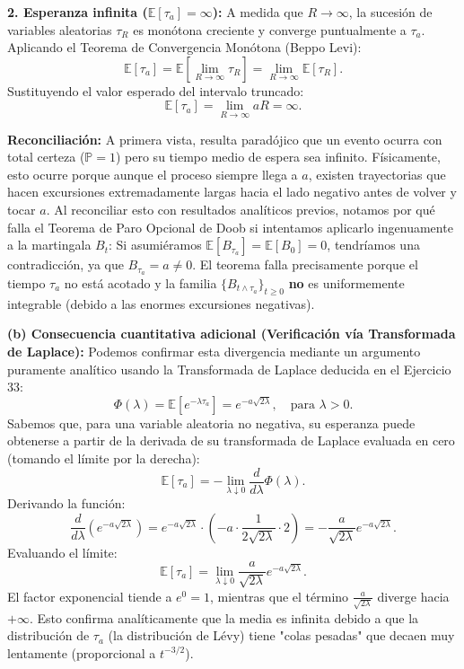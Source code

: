 \documentclass[11pt, letterpaper]{article}
\begin{document}
\begin{solucion}
    \textbf{2. Esperanza infinita ($\mathbb{E}[\tau_a] = \infty$):}
    A medida que $R \to \infty$, la sucesión de variables aleatorias $\tau_R$ es monótona creciente y converge puntualmente a $\tau_a$.
    Aplicando el Teorema de Convergencia Monótona (Beppo Levi):
    \[ \mathbb{E}[\tau_a] = \mathbb{E}\left[ \lim_{R \to \infty} \tau_R \right] = \lim_{R \to \infty} \mathbb{E}[\tau_R]. \]
    Sustituyendo el valor esperado del intervalo truncado:
    \[ \mathbb{E}[\tau_a] = \lim_{R \to \infty} aR = \infty. \]
    
    \textbf{Reconciliación:}
    A primera vista, resulta paradójico que un evento ocurra con total certeza ($\mathbb{P}=1$) pero su tiempo medio de espera sea infinito. Físicamente, esto ocurre porque aunque el proceso siempre llega a $a$, existen trayectorias que hacen excursiones extremadamente largas hacia el lado negativo antes de volver y tocar $a$.
    Al reconciliar esto con resultados analíticos previos, notamos por qué falla el Teorema de Paro Opcional de Doob si intentamos aplicarlo ingenuamente a la martingala $B_t$:
    Si asumiéramos $\mathbb{E}[B_{\tau_a}] = \mathbb{E}[B_0] = 0$, tendríamos una contradicción, ya que $B_{\tau_a} = a \neq 0$. El teorema falla precisamente porque el tiempo $\tau_a$ no está acotado y la familia $\{B_{t \wedge \tau_a}\}_{t \ge 0}$ \textbf{no} es uniformemente integrable (debido a las enormes excursiones negativas). 

    \vspace{3mm}
    \textbf{(b) Consecuencia cuantitativa adicional (Verificación vía Transformada de Laplace):}
    Podemos confirmar esta divergencia mediante un argumento puramente analítico usando la Transformada de Laplace deducida en el Ejercicio 33:
    \[ \Phi(\lambda) = \mathbb{E}[e^{-\lambda \tau_a}] = e^{-a\sqrt{2\lambda}}, \quad \text{para } \lambda > 0. \]
    Sabemos que, para una variable aleatoria no negativa, su esperanza puede obtenerse a partir de la derivada de su transformada de Laplace evaluada en cero (tomando el límite por la derecha):
    \[ \mathbb{E}[\tau_a] = -\lim_{\lambda \downarrow 0} \frac{d}{d\lambda} \Phi(\lambda). \]
    Derivando la función:
    \[ \frac{d}{d\lambda} \left( e^{-a\sqrt{2\lambda}} \right) = e^{-a\sqrt{2\lambda}} \cdot \left( -a \cdot \frac{1}{2\sqrt{2\lambda}} \cdot 2 \right) = -\frac{a}{\sqrt{2\lambda}} e^{-a\sqrt{2\lambda}}. \]
    Evaluando el límite:
    \[ \mathbb{E}[\tau_a] = \lim_{\lambda \downarrow 0} \frac{a}{\sqrt{2\lambda}} e^{-a\sqrt{2\lambda}}. \]
    El factor exponencial tiende a $e^0 = 1$, mientras que el término $\frac{a}{\sqrt{2\lambda}}$ diverge hacia $+\infty$.
    Esto confirma analíticamente que la media es infinita debido a que la distribución de $\tau_a$ (la distribución de Lévy) tiene "colas pesadas" que decaen muy lentamente (proporcional a $t^{-3/2}$).
\end{solucion}
\end{document}

